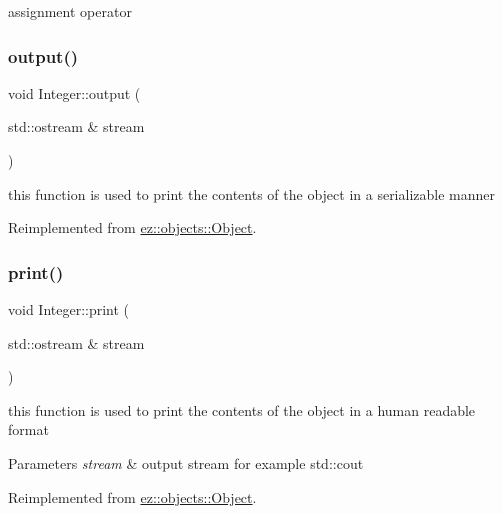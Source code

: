 assignment operator \mbox{\label{classez_1_1objects_1_1Integer_ab6035639fbee8c61086db044b731e213}} 
\subsubsection{\texorpdfstring{output()}{output()}}
{\footnotesize\ttfamily void Integer\+::output (\begin{DoxyParamCaption}\item[{std\+::ostream \&}]{stream }\end{DoxyParamCaption})\hspace{0.3cm}{\ttfamily [virtual]}}

this function is used to print the contents of the object in a serializable manner 

Reimplemented from \hyperlink{classez_1_1objects_1_1Object_a0fdfe18e6c35d6b0d7e7a01265aded15}{ez\+::objects\+::\+Object}.

\mbox{\label{classez_1_1objects_1_1Integer_a4d358be1f412fd702bd332cc4bf113bf}} 
\subsubsection{\texorpdfstring{print()}{print()}}
{\footnotesize\ttfamily void Integer\+::print (\begin{DoxyParamCaption}\item[{std\+::ostream \&}]{stream }\end{DoxyParamCaption})\hspace{0.3cm}{\ttfamily [virtual]}}

this function is used to print the contents of the object in a human readable format 
\begin{DoxyParams}{Parameters}
{\em stream} & output stream for example std\+::cout \\
\hline
\end{DoxyParams}


Reimplemented from \hyperlink{classez_1_1objects_1_1Object_a9e20f39a78163f67f000576149d858b3}{ez\+::objects\+::\+Object}.

